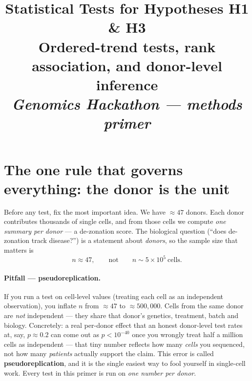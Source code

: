 \documentclass[11pt]{article}
\title{\vspace{-2em}\textbf{Statistical Tests for Hypotheses H1 \& H3}\\[0.3em]\large Ordered-trend tests, rank association, and donor-level inference\\[0.6em]\normalsize\textit{Genomics Hackathon --- methods primer}}
\author{}\date{}
\begin{document}
\maketitle
\tableofcontents

\bigskip

\noindent{}

\section{The one rule that governs everything: the donor is the unit}

Before any test, fix the most important idea. We have $\approx 47$ donors. Each donor contributes thousands of single cells, and from those cells we compute \emph{one summary per donor} --- a de-zonation score. The biological question (``does de-zonation track disease?'') is a statement about \emph{donors}, so the sample size that matters is
\[
n \approx 47, \qquad \text{not} \qquad n \sim 5\times 10^{5}\ \text{cells}.
\]

\paragraph{Pitfall --- pseudoreplication.} If you run a test on cell-level values (treating each cell as an independent observation), you inflate $n$ from $\approx 47$ to $\approx 500{,}000$. Cells from the same donor are \emph{not} independent --- they share that donor's genetics, treatment, batch and biology. Concretely: a real per-donor effect that an honest donor-level test rates at, say, $p\approx 0.2$ can come out as $p<10^{-40}$ once you wrongly treat half a million cells as independent --- that tiny number reflects how many \emph{cells} you sequenced, not how many \emph{patients} actually support the claim. This error is called \textbf{pseudoreplication}, and it is the single easiest way to fool yourself in single-cell work. Every test in this primer is run on \emph{one number per donor}.
\end{document}

